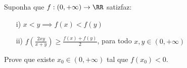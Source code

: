 Suponha que $f: (0, +\infty) \to \RR$ satizfaz:

\begin{itemize}
    \item[i)]  $x < y \implies f(x) < f(y)$
    \item[ii)] $f\left(\frac{2xy}{x+y}\right) \ge \frac{f(x) + f(y)}{2}$, para todo $x,y \in (0, +\infty)$
\end{itemize}

Prove que existe $x_0 \in (0, +\infty)$ tal que $f(x_0)<0$.